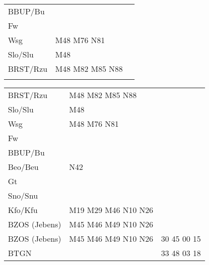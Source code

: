 \begin{tabular}{!{\color{schiefergrau}\vrule width 3pt}*{3}{l!{\color{schiefergrau}\vrule width 3pt}}}
BBUP/Bu      &                                                                   & \\
Fw           &                                                                   & \\
Wsg          & \mbus{} M48 M76 \nbus{} N81                                       & \\
Slo/Slu      & \mbus{} M48                                                       & \\
BRST/Rzu     & \mbus{} M48 M82 M85 \nbus{} N88                                   & \\
\myhline
\end{tabular}
%
\begin{tabular}{!{\color{schiefergrau}\vrule width 3pt}*{3}{l!{\color{schiefergrau}\vrule width 3pt}}}
\hline
{}
 \\
\hline
BRST/Rzu     & \mbus{} M48 M82 M85 \nbus{} N88                                   & \\
Slo/Slu      & \mbus{} M48                                                       & \\
Wsg          & \mbus{} M48 M76 \nbus{} N81                                       & \\
Fw           &                                                                   & \\
BBUP/Bu      &                                                                   & \\
Beo/Beu      & \nusieben{} \nbus{} N42                                           & \\
Gt           &                                                                   & \\
Sno/Snu      & \nudrei{}                                                         & \\
Kfo/Kfu      & \nueins{} \nuzwei{} \nudrei{} \mbus{} M19 M29 M46 \nbus{} N10 N26 & \\
BZOS (Jebens)& \nueins{} \nuzwei{} \mbus{} M45 M46 M49 \nbus{} N10 N26           & \\
\hline
BZOS (Jebens)& \nueins{} \nuzwei{} \mbus{} M45 M46 M49 \nbus{} N10 N26           & 30 45 00 15 \\
BTGN         &                                                                   & 33 48 03 18 \\

\end{tabular}

